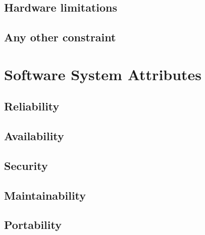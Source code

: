 \subsection{Hardware limitations}
\subsection{Any other constraint}

\section{Software System Attributes}
\subsection{Reliability}
\subsection{Availability}
\subsection{Security}
\subsection{Maintainability}
\subsection{Portability}